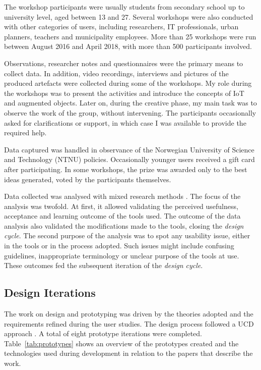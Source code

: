The workshop participants were usually students from secondary school up to university level, aged between 13 and 27. Several workshops were also conducted with other categories of users, including researchers, IT professionals, urban planners, teachers and municipality employees. More than 25 workshops were run between August 2016 and April 2018, with more than 500 participants involved.

Observations, researcher notes and questionnaires were the primary means to collect data. In addition, video recordings, interviews and pictures of the produced artefacts were collected during some of the workshops. My role during the workshops was to present the activities and introduce the concepts of IoT and augmented objects. Later on, during the creative phase, my main task was to observe the work of the group, without intervening. The participants occasionally asked for clarifications or support, in which case I was available to provide the required help.

Data captured was handled in observance of the Norwegian University of Science and Technology (NTNU) policies. Occasionally younger users received a gift card after participating. In some workshops, the prize was awarded only to the best ideas generated, voted by the participants themselves.

Data collected was analysed with mixed research methods \autocite{venkatesh_bridging_2013}. The focus of the analysis was twofold. At first, it allowed validating the perceived usefulness, acceptance and learning outcome of the tools used. The outcome of the data analysis also validated the modifications made to the tools, closing the \emph{design cycle}.
The second purpose of the analysis was to spot any usability issue, either in the tools or in the process adopted. Such issues might include confusing guidelines, inappropriate terminology or unclear purpose of the tools at use. These outcomes fed the subsequent iteration of the \emph{design cycle}.

\subsection{Design Iterations}
\label{sec:prototypes}

The work on design and prototyping was driven by the theories adopted and the requirements refined during the user studies. The design process followed a UCD approach \autocites{maguire_methods_2001}{gulliksen_key_2003}. A total of eight prototype iterations were completed. Table~\ref{tab:prototypes} shows an overview of the prototypes created and the technologies used during development in relation to the papers that describe the work.


